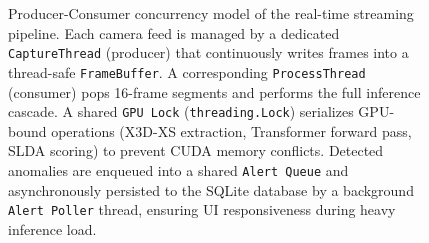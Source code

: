 \documentclass[12pt]{article}
\begin{document}
\begin{figure}[H]
{
    }%
    \caption{Producer-Consumer concurrency model of the real-time streaming pipeline. Each camera feed is managed by a dedicated \texttt{CaptureThread} (producer) that continuously writes frames into a thread-safe \texttt{FrameBuffer}. A corresponding \texttt{ProcessThread} (consumer) pops 16-frame segments and performs the full inference cascade. A shared \texttt{GPU Lock} (\texttt{threading.Lock}) serializes GPU-bound operations (X3D-XS extraction, Transformer forward pass, SLDA scoring) to prevent CUDA memory conflicts. Detected anomalies are enqueued into a shared \texttt{Alert Queue} and asynchronously persisted to the SQLite database by a background \texttt{Alert Poller} thread, ensuring UI responsiveness during heavy inference load.}
    \label{fig:concurrency_model}
\end{figure}
\end{document}
